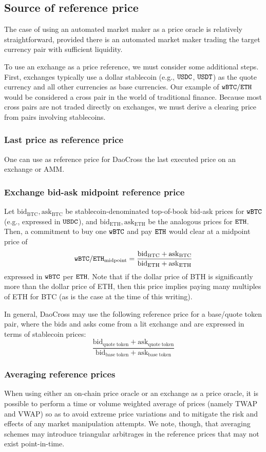 \documentclass[11pt, reqno]{amsart}
\theoremstyle{definition}
\theoremstyle{remark}
\newcommand{\bidbtc}{\mathrm{bid}_\mathrm{BTC}}
\newcommand{\askbtc}{\mathrm{ask}_\mathrm{BTC}}
\newcommand{\bideth}{\mathrm{bid}_\mathrm{ETH}}
\newcommand{\asketh}{\mathrm{ask}_\mathrm{ETH}}
\newcommand{\bidbase}{\mathrm{bid}_\mathrm{quote\;token}}
\newcommand{\askbase}{\mathrm{ask}_\mathrm{quote\;token}}
\newcommand{\bidquote}{\mathrm{bid}_\mathrm{base\;token}}
\newcommand{\askquote}{\mathrm{ask}_\mathrm{base\;token}}
\newcommand{\BTC}{\textnormal{\texttt{wBTC}}}
\newcommand{\ETH}{\textnormal{\texttt{ETH}}}
\newcommand{\USDC}{\textnormal{\texttt{USDC}}}
\newcommand{\USDT}{\textnormal{\texttt{USDT}}}
\newcommand{\midpoint}{\mathrm{midpoint}}
\begin{document}
\subsection{Source of reference price}
The case of using an automated market maker as a price oracle is relatively
straightforward, provided there is an automated market maker trading the
target currency pair with sufficient liquidity.

To use an exchange as a price reference, we must consider some additional
steps. First, exchanges typically use a dollar stablecoin (e.g., $\USDC$,
$\USDT$) as the quote currency and all other currencies as base currencies. Our
example of $\BTC/\ETH$ would be considered a cross pair in the world of
traditional finance. Because most cross pairs are not traded directly on
exchanges, we must derive a clearing price from pairs involving stablecoins.

\subsubsection{Last price as reference price}
One can use as reference price for DaoCross the last executed price on an
exchange or AMM.

\subsubsection{Exchange bid-ask midpoint reference price}
Let $\bidbtc, \askbtc$ be stablecoin-denominated top-of-book bid-ask prices
for $\BTC$ (e.g., expressed in $\USDC$), and $\bideth, \asketh$ be the analogous
prices for $\ETH$. Then, a commitment to buy one $\BTC$ and pay $\ETH$ would
clear at a midpoint price of
\[
	\BTC/\ETH_{\midpoint} = \frac{\bidbtc + \askbtc}{\bideth + \asketh}
\]
expressed in $\BTC$ per $\ETH$. Note that if the dollar price of BTH is significantly
more than the dollar price of ETH, then this price implies paying many
multiples of ETH for BTC (as is the case at the time of this writing).

In general, DaoCross may use the following reference price for a base/quote
token pair, where the bids and asks come from a lit exchange and are expressed
in terms of stablecoin prices:
\begin{equation}
	\frac{\bidbase + \askbase}{\bidquote + \askquote}
\end{equation}

\subsubsection{Averaging reference prices}
When using either an on-chain price oracle or an exchange as a price oracle,
it is possible to perform a time or volume weighted average of prices (namely
TWAP and VWAP) so as to avoid extreme price variations and to mitigate the risk
and effects of any market manipulation attempts. We note, though, that
averaging schemes may introduce triangular arbitrages in the reference prices
that may not exist point-in-time.
\end{document}
